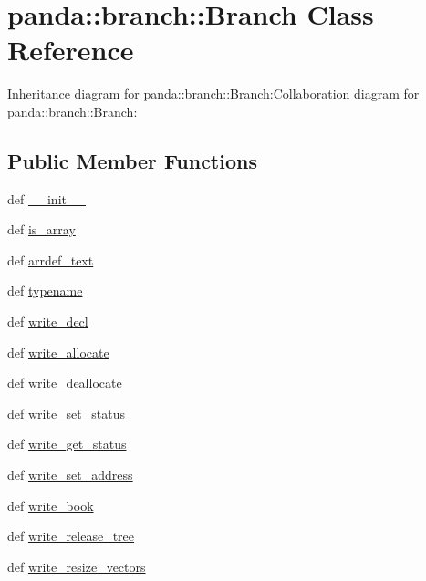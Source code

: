 \hypertarget{classpanda_1_1branch_1_1Branch}{
\section{panda::branch::Branch Class Reference}
\label{classpanda_1_1branch_1_1Branch}
}
Inheritance diagram for panda::branch::Branch:Collaboration diagram for panda::branch::Branch:\subsection*{Public Member Functions}
\begin{DoxyCompactItemize}
\item 
def \hyperlink{classpanda_1_1branch_1_1Branch_a5b3cb923ee20a15362151dd2bf29ae62}{\_\-\_\-init\_\-\_\-}
\item 
def \hyperlink{classpanda_1_1branch_1_1Branch_af707e9b8d07cdf016923cd0f22f921aa}{is\_\-array}
\item 
def \hyperlink{classpanda_1_1branch_1_1Branch_a001d0a6757fd6fd54743f5d361850b93}{arrdef\_\-text}
\item 
def \hyperlink{classpanda_1_1branch_1_1Branch_a5db438acba1b1fe4f66b41eaabd0f042}{typename}
\item 
def \hyperlink{classpanda_1_1branch_1_1Branch_a25d82deb9cd13e96ee61c094d8c23992}{write\_\-decl}
\item 
def \hyperlink{classpanda_1_1branch_1_1Branch_aa95fcc11b08357eb8bdc4b649c15ca9c}{write\_\-allocate}
\item 
def \hyperlink{classpanda_1_1branch_1_1Branch_a4c286519caece422014891fdc5135c34}{write\_\-deallocate}
\item 
def \hyperlink{classpanda_1_1branch_1_1Branch_a1d1a6885ab00f4d6245c223a91f9d10f}{write\_\-set\_\-status}
\item 
def \hyperlink{classpanda_1_1branch_1_1Branch_ae54e0358ee4028d5875de8fd6435bb4e}{write\_\-get\_\-status}
\item 
def \hyperlink{classpanda_1_1branch_1_1Branch_a31c2ee7d2aa515eb15dd62e38b9fcffd}{write\_\-set\_\-address}
\item 
def \hyperlink{classpanda_1_1branch_1_1Branch_a120d981b4287966d51cf650eea6d8b5e}{write\_\-book}
\item 
def \hyperlink{classpanda_1_1branch_1_1Branch_ad9b2a0293cf145028350b6c9085f4e8f}{write\_\-release\_\-tree}
\item 
def \hyperlink{classpanda_1_1branch_1_1Branch_ad8ad0994d7e6cbdf7d68572d942f9873}{write\_\-resize\_\-vectors}

\end{DoxyCompactItemize}
